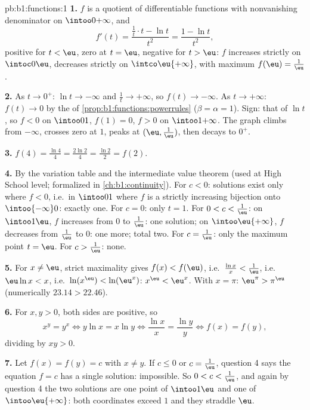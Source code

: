\begin{solution}{pb:b1:functions:1}
\textbf{1.} $f$ is a quotient of differentiable functions with
nonvanishing denominator on $\intoo0{+\infty}$, and
\[
f'(t) = \frac{\frac1t \cdot t - \ln t}{t^2} = \frac{1 - \ln
t}{t^2} ,
\]
positive for $t < \eu$, zero at $t = \eu$, negative for $t > \eu$:
$f$ increases strictly on $\intoc0\eu$, decreases strictly on
$\intco\eu{+\infty}$, with maximum $f(\eu) = \frac1\eu$.

\textbf{2.} As $t \to 0^+$: $\ln t \to -\infty$ and $\frac1t \to
+\infty$, so $f(t) \to -\infty$. As $t \to +\infty$: $f(t) \to 0$
by the  of \cref{prop:b1:functions:powerrules}
($\beta = \alpha = 1$). Sign: that of $\ln t$, so $f < 0$ on
$\intoo01$, $f(1) = 0$, $f > 0$ on $\intoo1{+\infty}$. The graph
climbs from $-\infty$, crosses zero at $1$, peaks at $(\eu,
\frac1\eu)$, then decays to $0^+$.

\textbf{3.} $f(4) = \frac{\ln 4}4 = \frac{2\ln 2}4 = \frac{\ln 2}2
= f(2)$.

\textbf{4.} By the variation table and the intermediate value
theorem (used at High School level; formalized in
\cref{ch:b1:continuity}). For $c < 0$: solutions exist only where
$f < 0$, i.e.\ in $\intoo01$ where $f$ is a strictly increasing
bijection onto $\intoo{-\infty}0$: exactly one. For $c = 0$: only
$t = 1$. For $0 < c < \frac1\eu$: on $\intoo1\eu$, $f$ increases
from $0$ to $\frac1\eu$: one solution; on $\intoo\eu{+\infty}$,
$f$ decreases from $\frac1\eu$ to $0$: one more; total two. For
$c = \frac1\eu$: only the maximum point $t = \eu$. For $c >
\frac1\eu$: none.

\textbf{5.} For $x \neq \eu$, strict maximality gives $f(x) <
f(\eu)$, i.e.\ $\frac{\ln x}x < \frac1\eu$, i.e.\ $\eu\ln x < x$,
i.e.\ $\ln(x^\eu) < \ln(\eu^x)$: $x^\eu < \eu^x$. With $x = \pi$:
$\eu^\pi > \pi^\eu$ (numerically $23.14 > 22.46$).

\textbf{6.} For $x, y > 0$, both sides are positive, so
\[
x^y = y^x \iff y\ln x = x\ln y \iff \frac{\ln x}x = \frac{\ln y}y
\iff f(x) = f(y) ,
\]
dividing by $xy > 0$.

\textbf{7.} Let $f(x) = f(y) = c$ with $x \neq y$. If $c \leq 0$ or
$c = \frac1\eu$, question 4 says the equation $f = c$ has a single
solution: impossible. So $0 < c < \frac1\eu$, and again by
question 4 the two solutions are one point of $\intoo1\eu$ and one
of $\intoo\eu{+\infty}$: both coordinates exceed $1$ and they
straddle $\eu$.


\end{solution}
